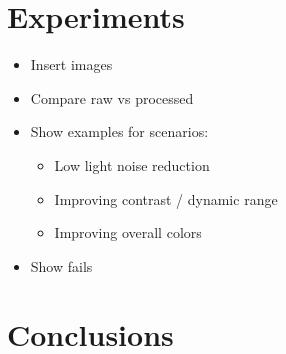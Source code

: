 \documentclass{egpubl}
\begin{document}
\section{Experiments}
\label{sec:Experiments}

\begin{itemize}
      \item Insert images
      \item Compare raw vs processed
      \item Show examples for scenarios:
      \begin{itemize}
            \item Low light noise reduction
            \item Improving contrast / dynamic range
            \item Improving overall colors
      \end{itemize}
      \item Show fails
\end{itemize} 

\section{Conclusions}
\end{document}
